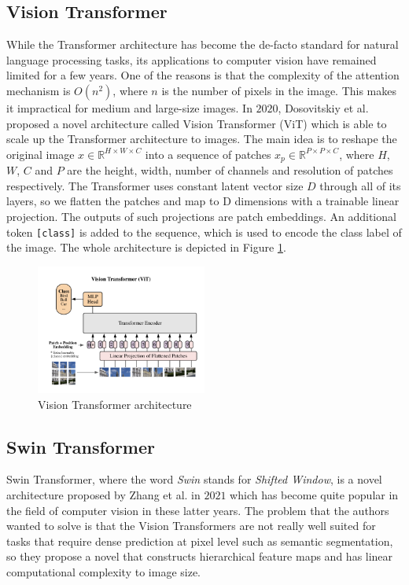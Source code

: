 \subsection{Vision Transformer}
While the Transformer architecture has become the de-facto standard for natural
language processing tasks, its applications to computer vision have remained
limited for a few years. One of the reasons is that the complexity of the
attention mechanism is $O(n^2)$, where $n$ is the number of pixels in the image.
This makes it impractical for medium and large-size images. In $2020$,
Dosovitskiy et al. proposed a novel architecture called Vision Transformer (ViT)
which is able to scale up the Transformer architecture to images. The main idea
is to reshape the original image $x \in \mathbb{R}^{H \times W \times C}$ into a
sequence of patches $x_p \in \mathbb{R}^{P \times P \times C}$, where $H$, $W$,
$C$ and $P$ are the height, width, number of channels and resolution of patches
respectively. The Transformer uses constant latent vector size $D$ through all
of its layers, so we flatten the patches and map to D dimensions with a
trainable linear projection. The outputs of such projections are patch
embeddings. An additional token \texttt{[class]} is added to the sequence, which
is used to encode the class label of the image. The whole architecture is
depicted in Figure \ref{fig:visiontransformer}.

\begin{figure}[ht!]
  \centering
  \includegraphics[width=0.5\textwidth]{Images/ViT.png}
  \caption{Vision Transformer architecture}
  \label{fig:visiontransformer}
\end{figure}


\subsection{Swin Transformer}
Swin Transformer, where the word \emph{Swin} stands for \emph{Shifted Window},
is a novel architecture proposed by Zhang et al. in $2021$ which has become
quite popular in the field of computer vision in these latter years. The problem
that the authors wanted to solve is that the Vision Transformers are not really
well suited for tasks that require dense prediction at pixel level such as
semantic segmentation, so they propose a novel that constructs hierarchical
feature maps and has linear computational complexity to image size.

